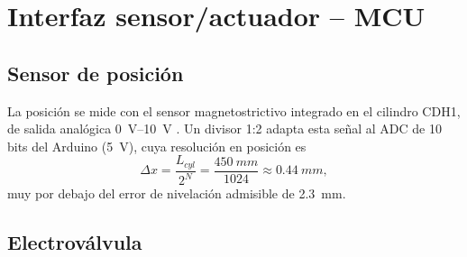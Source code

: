 \documentclass[conference]{IEEEtran}
\begin{document}
\section{Interfaz sensor/actuador -- MCU}
\label{sec:interfaz}

\subsection{Sensor de posición}
La posición se mide con el sensor magnetostrictivo integrado en el cilindro CDH1, de salida analógica \SIrange{0}{10}{V} \cite{rexroth}. Un divisor 1:2 adapta esta señal al ADC de 10 bits del Arduino (\SI{5}{V}), cuya resolución en posición es
\begin{equation}
\Delta x = \frac{L_{cyl}}{2^{N}} = \frac{\SI{450}{mm}}{1024} \approx \SI{0.44}{mm},
\label{eq:resolucion}
\end{equation}
muy por debajo del error de nivelación admisible de \SI{2.3}{mm}.

\subsection{Electroválvula}
\end{document}
